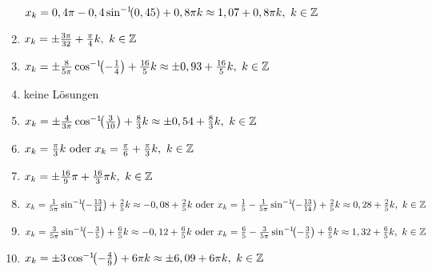 \begin{Answer}[ref=sincosGleichungenAllgA1]
\begin{enumerate}[label=\alph*)]
        \(x_k=0,4\pi-0,4\arcsinn{0,45} +0,8\pi k\approx 1,07+0,8\pi k,\ k\in\Z\)
		\item \(x_k=\pm \frac{3\pi}{32} +\frac{\pi}{4} k,\ k\in\mathbb{Z}\)
		\item \(x_k=\pm \frac{8}{5\pi}\arccoss{-\frac{1}{4}} +\frac{16}{5} k\approx\pm 0,93 +\frac{16}{5} k,\ k\in\Z\)
		\item keine Lösungen
		\item \(x_k=\pm \frac{4}{3\pi}\arccoss{\frac{3}{10}} +\frac{8}{3} k\approx\pm 0,54 +\frac{8}{3} k,\ k\in\Z\)
		\item \(x_k=\frac{\pi}{3} k\text{ oder }x_k=\frac{\pi}{6} +\frac{\pi}{3} k,\ k\in\mathbb{Z}\)
		\item \(x_k=\pm \frac{16}{9}\pi +\frac{16}{3}\pi k,\ k\in\mathbb{Z}\)
		\item \(x_k=\frac{1}{5\pi}\arcsinn{-\frac{13}{14}} +\frac{2}{5} k\approx -0,08+\frac{2}{5} k\text{ oder }x_k=\frac{1}{5}-\frac{1}{5\pi}\arcsinn{-\frac{13}{14}} +\frac{2}{5} k\approx 0,28+\frac{2}{5} k,\ k\in\Z\)
		\item \(x_k=\frac{3}{5\pi}\arcsinn{-\frac{3}{5}} +\frac{6}{5} k\approx -0,12+\frac{6}{5} k\text{ oder }x_k=\frac{6}{5}-\frac{3}{5\pi}\arcsinn{-\frac{3}{5}} +\frac{6}{5} k\approx 1,32+\frac{6}{5} k,\ k\in\Z\)
		\item \(x_k=\pm 3\arccoss{-\frac{4}{9}} +6\pi k\approx \pm 6,09 +6\pi k,\ k\in\Z\)
	\end{enumerate}
\end{Answer}